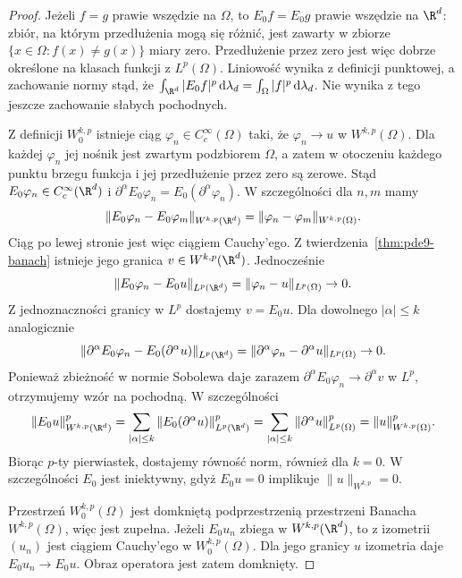 \begin{proof}
Jeżeli $f=g$ prawie wszędzie na $\Omega$, to
$E_0f=E_0g$ prawie wszędzie na $\R^d$: zbiór,
na którym przedłużenia mogą się różnić, jest zawarty
w zbiorze $\{x\in\Omega:f(x)\ne g(x)\}$ miary zero.
Przedłużenie przez zero jest więc dobrze określone
na klasach funkcji z $L^p(\Omega)$. Liniowość wynika
z definicji punktowej, a zachowanie normy stąd, że $\int_{\R^d}|E_0f|^p\,\mathrm d\lambda_d
=\int_\Omega|f|^p\,\mathrm d\lambda_d$.
Nie wynika z tego jeszcze zachowanie słabych pochodnych.

Z definicji $W^{k,p}_0$ istnieje ciąg
$\varphi_n\in C_c^\infty(\Omega)$ taki, że
$\varphi_n\to u$ w $W^{k,p}(\Omega)$.
Dla każdej $\varphi_n$ jej nośnik jest zwartym podzbiorem
$\Omega$, a zatem w otoczeniu każdego punktu brzegu
funkcja i jej przedłużenie przez zero są zerowe.
Stąd $E_0\varphi_n\in C_c^\infty(\R^d)$ i
$\partial^\alpha E_0\varphi_n=E_0(\partial^\alpha\varphi_n)$.
W szczególności dla $n,m$ mamy
\[
 \|E_0\varphi_n-E_0\varphi_m\|_{W^{k,p}(\R^d)}
 =\|\varphi_n-\varphi_m\|_{W^{k,p}(\Omega)}.
\]
Ciąg po lewej stronie jest więc ciągiem Cauchy'ego.
Z twierdzenia~\ref{thm:pde9-banach} istnieje jego
granica $v\in W^{k,p}(\R^d)$.
Jednocześnie
\[
 \|E_0\varphi_n-E_0u\|_{L^p(\R^d)}
 =\|\varphi_n-u\|_{L^p(\Omega)}\to0.
\]
Z jednoznaczności granicy w $L^p$ dostajemy $v=E_0u$.
Dla dowolnego $|\alpha|\le k$ analogicznie
\[
 \|\partial^\alpha E_0\varphi_n-E_0(\partial^\alpha u)\|_{L^p(\R^d)}
 =\|\partial^\alpha\varphi_n-\partial^\alpha u\|_{L^p(\Omega)}
 \to0.
\]
Ponieważ zbieżność w normie Sobolewa daje zarazem
$\partial^\alpha E_0\varphi_n\to\partial^\alpha v$ w $L^p$,
otrzymujemy wzór na pochodną. W szczególności
\[
 \|E_0u\|_{W^{k,p}(\R^d)}^p
 =\sum_{|\alpha|\le k}
 \|E_0(\partial^\alpha u)\|_{L^p(\R^d)}^p
 =\sum_{|\alpha|\le k}\|\partial^\alpha u\|_{L^p(\Omega)}^p
 =\|u\|_{W^{k,p}(\Omega)}^p.
\]
Biorąc $p$-ty pierwiastek, dostajemy równość norm,
również dla $k=0$. W szczególności $E_0$ jest
iniektywny, gdyż $E_0u=0$ implikuje $\|u\|_{W^{k,p}}=0$.

Przestrzeń $W^{k,p}_0(\Omega)$ jest domkniętą podprzestrzenią
przestrzeni Banacha $W^{k,p}(\Omega)$, więc jest zupełna.
Jeżeli $E_0u_n$ zbiega w $W^{k,p}(\R^d)$, to z izometrii
$(u_n)$ jest ciągiem Cauchy'ego w $W^{k,p}_0(\Omega)$.
Dla jego granicy $u$ izometria daje $E_0u_n\to E_0u$.
Obraz operatora jest zatem domknięty.
\end{proof}


